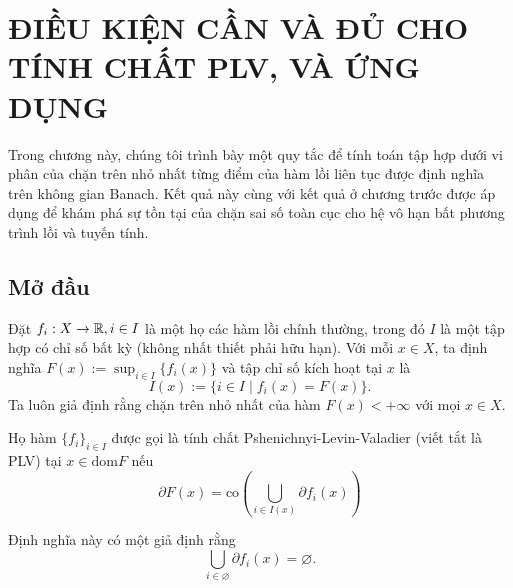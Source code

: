 \chapter{ĐIỀU KIỆN CẦN VÀ ĐỦ CHO TÍNH CHẤT PLV, VÀ ỨNG DỤNG}

Trong chương này, chúng tôi trình bày một quy tắc để tính toán tập hợp dưới vi phân của chặn trên nhỏ nhất từng điểm của hàm lồi liên tục được định nghĩa trên không gian Banach. Kết quả này cùng với kết quả ở chương trước được áp dụng để khám phá sự tồn tại của chặn sai số toàn cục cho hệ vô hạn bất phương trình lồi và tuyến tính.

\section{Mở đầu}

Đặt $f_i: X \rightarrow \mathbb{R}, i \in I$ là một họ các hàm lồi chính thường, trong đó $I$ là một tập hợp có chỉ số bất kỳ (không nhất thiết phải hữu hạn). Với mỗi $x \in X$, ta định nghĩa $F(x) := \sup_{i \in I}\{f_i(x)\}$ và tập chỉ số kích hoạt tại $x$ là
\begin{equation}
    I(x) := \{ i \in I \mid f_i(x) = F(x)\}.
\end{equation}
Ta luôn giả định rằng chặn trên nhỏ nhất của hàm $F(x) < +\infty$ với mọi $x \in X$.

\begin{defi}
    Họ hàm $\{f_i\}_{i \in I}$ được gọi là tính chất Pshenichnyi-Levin-Valadier (viết tắt là PLV) tại $x \in \text{dom}F$ nếu
    \begin{equation}
        \label{eq:plv}
        \partial F(x) = \text{co}\left(\bigcup_{i \in I(x)} \partial f_i(x) \right)
    \end{equation}
\end{defi}
Định nghĩa này có một giả định rằng
\begin{equation}
    \bigcup_{i \in \varnothing}\partial f_i(x) = \varnothing.
\end{equation}


